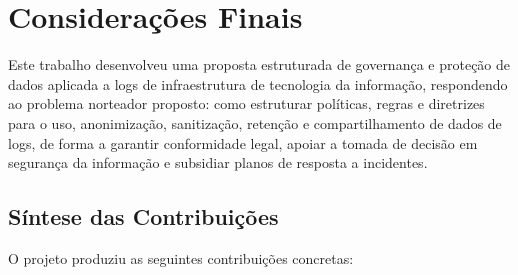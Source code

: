 
\chapter{Considerações Finais}
\label{cap:conclusao}

Este trabalho desenvolveu uma proposta estruturada de governança e proteção de dados aplicada a logs de infraestrutura de tecnologia da informação, respondendo ao problema norteador proposto: como estruturar políticas, regras e diretrizes para o uso, anonimização, sanitização, retenção e compartilhamento de dados de logs, de forma a garantir conformidade legal, apoiar a tomada de decisão em segurança da informação e subsidiar planos de resposta a incidentes.

\section{Síntese das Contribuições}
\label{sec:sintese}

O projeto produziu as seguintes contribuições concretas:

